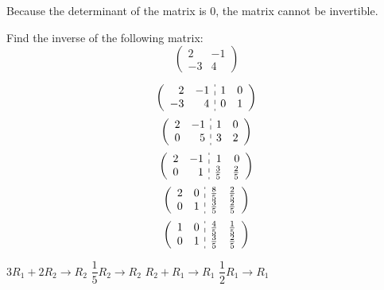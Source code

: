 \documentclass[11pt,letterpaper]{article}
\begin{document}
Because the determinant of the matrix is 0, the matrix cannot be invertible. 





\newpage





 Find the inverse of the following matrix:
	\[
	\begin{pmatrix}
	2 & -1 \\
	-3 & 4
	\end{pmatrix}
	\] \pspace

\sol \par
\begin{minipage}[t]{0.49\textwidth}
	\[
	\left(
	\begin{array}{rr:rr}
	2 & -1 & 1 & 0 \\
	-3 & 4 & 0 & 1 
	\end{array} 
	\right)
	\]
	\[
	\left(
	\begin{array}{rr:rr}
	2 & -1 & 1 & 0 \\
	0 & 5 & 3 & 2 
	\end{array} 
	\right)
	\]
	\[
	\left(
	\begin{array}{rr:rr}
	2 & -1 & 1 & 0 \\
	0 & 1 & \frac{3}{5} & \frac{2}{5}
	\end{array} 
	\right)
	\]
	\[
	\left(
	\begin{array}{rr:rr}
	2 & 0 & \frac{8}{5} & \frac{2}{5} \\
	0 & 1 & \frac{3}{5} & \frac{2}{5}
	\end{array} 
	\right)
	\]
	\[
	\left(
	\begin{array}{rr:rr}
	1 & 0 & \frac{4}{5} & \frac{1}{5} \\
	0 & 1 & \frac{3}{5} & \frac{2}{5}
	\end{array} 
	\right)
	\]
\end{minipage}%
\begin{minipage}[t]{0.49\textwidth}
\pvspace{0.3cm}
$3R_1 + 2R_2 \to R_2$ \pvspace{0.6cm}
$\dfrac{1}{5}R_2 \to R_2$ \pvspace{0.7cm}
$R_2 + R_1 \to R_1$ \pvspace{0.6cm}
$\dfrac{1}{2}R_1 \to R_1$
\end{minipage} \pspace
\end{document}
